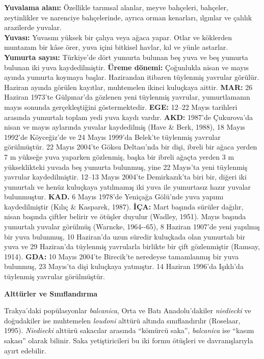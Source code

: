 \documentclass[
  10.5pt,
  a4paper,
  DIV=11,
  numbers=noendperiod,
  twocolumn]{scrreprt}
\begin{document}
\textbf{Yuvalama alanı:} Özellikle tarımsal alanlar, meyve bahçeleri,
bahçeler, zeytinlikler ve narenciye bahçelerinde, ayrıca orman
kenarları, ılgınlar ve çalılık arazilerde yuvalar.\\
\textbf{Yuvası:} Yuvasını yüksek bir çalıya veya ağaca yapar. Otlar ve
köklerden muntazam bir kâse örer, yuva içini bitkisel havlar, kıl ve
yünle astarlar.\\
\textbf{Yumurta sayısı:} Türkiye'de dört yumurta bulunan beş yuva ve beş
yumurta bulunan iki yuva kaydedilmiştir. \textbf{Üreme dönemi:}
Çoğunlukla nisan ve mayıs ayında yumurta koymaya başlar. Hazirandan
itibaren tüylenmiş yavrular görülür. Haziran ayında görülen kayıtlar,
muhtemelen ikinci kuluçkaya aittir. \textbf{MAR:} 26 Haziran 1973'te
Gülpınar'da gözlenen yeni tüylenmiş yavrular, yumurtlamanın mayıs
sonunda gerçekleştiğini göstermektedir. \textbf{EGE:} 12--22 Mayıs
tarihleri arasında yumurtalı toplam yedi yuva kaydı vardır.
\textbf{AKD:} 1987'de Çukurova'da nisan ve mayıs aylarında yuvalar
kaydedilmiş (Have \& Berk, 1988), 18 Mayıs 1992'de Köyceğiz'de ve 24
Mayıs 1999'da Belek'te tüylenmiş yavrular görülmüştür. 22 Mayıs 2004'te
Göksu Deltası'nda bir dişi, ibreli bir ağaca yerden 7 m yükseğe yuva
yaparken gözlenmiş, başka bir ibreli ağaçta yerden 3 m yükseklikteki
yuvada beş yumurta bulunmuş, yine 22 Mayıs'ta yeni tüylenmiş yavrular
kaydedilmiştir. 12--13 Mayıs 2004'te Demirkazık'ta biri bir, diğeri iki
yumurtalı ve henüz kuluçkaya yatılmamış iki yuva ile yumurtasız hazır
yuvalar bulunmuştur. \textbf{KAD.} 6 Mayıs 1978'de Yeniçağa Gölü'nde
yuva yapımı kaydedilmiştir (Kılıç \& Kasparek, 1987). \textbf{İÇA:} Mart
başında sürüler dağılır, nisan başında çiftler belirir ve ötüşler
duyulur (Wadley, 1951). Mayıs başında yumurtalı yuvalar görülmüş
(Warncke, 1964-\/-65), 8 Haziran 1907'de yeni yapılmış bir yuva
bulunmuş, 10 Haziran'da uzun süredir kuluçkada olan yumurtalı bir yuva
ve 29 Haziran'da tüylenmiş yavrularla birlikte bir çift gözlenmiştir
(Ramsay, 1914). \textbf{GDA:} 10 Mayıs 2004'te Birecik'te neredeyse
tamamlanmış bir yuva bulunmuş, 23 Mayıs'ta dişi kuluçkaya yatmıştır. 14
Haziran 1996'da Işıklı'da tüylenmiş yavrular görülmüştür.

\textbf{Alttürler ve Sınıflandırma}

Trakya'daki popülasyonlar \emph{balcanica}, Orta ve Batı Anadolu'dakiler
\emph{niediecki} ve doğudakiler ise muhtemelen \emph{loudoni} alttürü
altında sınıflandırılır (Roselaar, 1995). \emph{Niediecki} alttürü
sakacılar arasında ``kömürcü saka'', \emph{balcanica} ise ``kasım
sakası'' olarak bilinir. Saka yetiştiricileri bu iki formu ötüşleri ve
davranışlarıyla ayırt edebilir.
\end{document}
